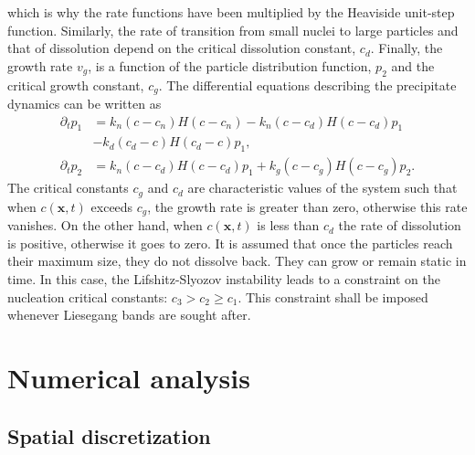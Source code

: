 \documentclass[aps,preprint]{revtex4}
\begin{document}
which is why the rate functions have been multiplied by the Heaviside
unit-step function. Similarly, the rate of transition from small nuclei to
large particles and that of dissolution depend on the critical dissolution
constant, $c_{d}$. Finally, the growth rate $v_{g}$, is a function of the particle
distribution function, $p_{2}$ and the critical growth constant, $c_{g}$. The
differential equations describing the precipitate dynamics can be written as
\begin{align}
\partial_{t} p_{1}  &  =k_{n} \left(  c-c_{n} \right)  H\left(  c-c_{n}
\right)  - k_{n} \left(  c-c_{d} \right)  H\left(  c-c_{d} \right)
p_{1}\nonumber\\
&  - k_{d} \left(  c_{d}-c\right)  H\left(  c_{d}-c\right)  p_{1}
,\label{nuclei}\\
\partial_{t}p_{2}  &  =k_{n}\left(  c-c_{d}\right)  H\left(  c-c_{d}\right)
p_{1}+k_{g}\left(  c-c_{g}\right)  H\left(  c-c_{g}\right)  p_{2}
.\label{particles}
\end{align}
The critical constants $c_{g}$ and $c_{d}$ are characteristic values of the
system such that when $c\left(  \mathbf{x},t\right)$ exceeds $c_{g}$, the
growth rate is greater than zero, otherwise this rate vanishes. On the other
hand, when $c\left(  \mathbf{x},t\right)$ is less than $c_{d}$ the rate of dissolution is
positive, otherwise it goes to zero. It is assumed that once the particles
reach their maximum size, they do not dissolve back. They can grow or remain
static in time. In this case, the Lifshitz-Slyozov instability \cite{Lifshitz}
leads to a constraint on the nucleation critical constants: $c_{3} > c_{2}
\geq c_{1}$. This constraint shall be imposed whenever Liesegang bands are sought after.

\section{Numerical analysis}

\subsection{Spatial discretization}
\end{document}
